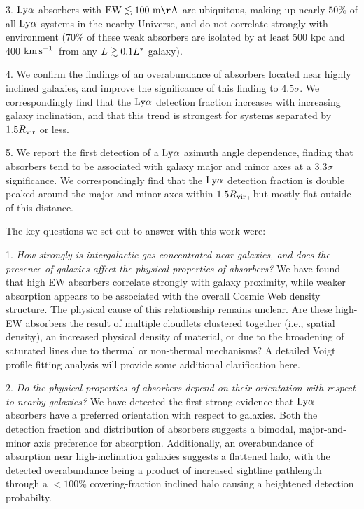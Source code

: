 \documentclass[twocolumn,tighten]{aastex62}
\newcommand{\kms}{$\rm km\, s^{-1}$}
\begin{document}
3. $\rm Ly\alpha$ absorbers with $\rm EW \lesssim 100~m\AA$ are ubiquitous, making up nearly $50\%$ of all $\rm Ly\alpha$ systems in the nearby Universe, and do not correlate strongly with environment ($70\%$ of these weak absorbers are isolated by at least 500 kpc and 400 \kms~from any $L \gtrsim0.1 L^{\**}$ galaxy). 

4. We confirm the \cite{french2017} findings of an overabundance of absorbers located near highly inclined galaxies, and improve the significance of this finding to $4.5\sigma$. We correspondingly find that the $\rm Ly\alpha$ detection fraction increases with increasing galaxy inclination, and that this trend is strongest for systems separated by $1.5 R_{\rm vir}$ or less.

5. We report the first detection of a $\rm Ly\alpha$ azimuth angle dependence, finding that absorbers tend to be associated with galaxy major and minor axes at a $3.3\sigma$ significance. We correspondingly find that the $\rm Ly\alpha$ detection fraction is double peaked around the major and minor axes within $1.5 R_{\rm vir}$, but mostly flat outside of this distance.


The key questions we set out to answer with this work were:

1. \emph{How strongly is intergalactic gas concentrated near galaxies, and does the presence of galaxies affect the physical properties of absorbers?}
We have found that high EW absorbers correlate strongly with galaxy proximity, while weaker absorption appears to be associated with the overall Cosmic Web density structure. The physical cause of this relationship remains unclear. Are these high-EW absorbers the result of multiple cloudlets clustered together (i.e., spatial density), an increased physical density of material, or due to the broadening of saturated lines due to thermal or non-thermal mechanisms? A detailed Voigt profile fitting analysis will provide some additional clarification here.

\vspace{10pt}

2. \emph{Do the physical properties of absorbers depend on their orientation with respect to nearby galaxies?}
We have detected the first strong evidence that $\rm Ly\alpha$ absorbers have a preferred orientation with respect to galaxies.  Both the detection fraction and distribution of absorbers suggests a bimodal, major-and-minor axis preference for absorption. Additionally, an overabundance of absorption near high-inclination galaxies suggests a flattened halo, with the detected overabundance being a product of increased sightline pathlength through a $<100\%$ covering-fraction inclined halo causing a heightened detection probabilty.
\end{document}
